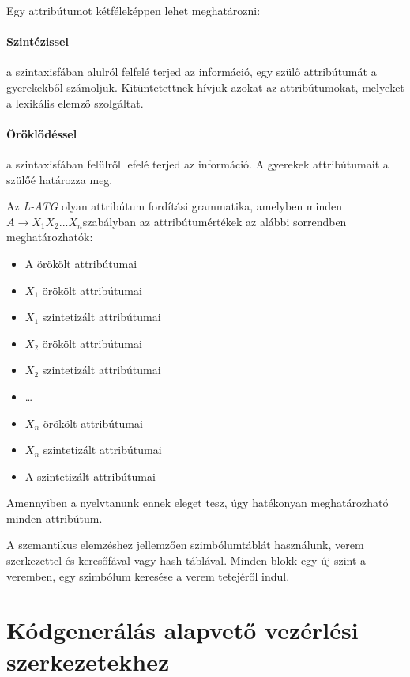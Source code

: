 \documentclass[margin=0px]{article}
\begin{document}
	Egy attribútumot kétféleképpen lehet meghatározni:
	
	\paragraph{Szintézissel} a szintaxisfában alulról felfelé terjed az információ, egy szülő attribútumát a gyerekekből számoljuk. Kitüntetettnek hívjuk azokat az attribútumokat, melyeket a lexikális elemző szolgáltat.
	
	\paragraph{Öröklődéssel} a szintaxisfában felülről lefelé terjed az információ. A gyerekek attribútumait a szülőé határozza meg.
	
	Az \textit{L-ATG} olyan attribútum fordítási grammatika, amelyben minden
	$ A	\rightarrow	X_1X_2 . . .	X_n  $szabályban az attribútumértékek az alábbi sorrendben meghatározhatók:
	
	\begin{itemize}
		\item 
		A örökölt attribútumai
		\item 
		$ X_1 $ örökölt attribútumai
		\item 
		$ X_1 $ szintetizált attribútumai
		\item 
		$ X_2 $ örökölt attribútumai
		\item 
		$ X_2 $ szintetizált attribútumai
		\item 
		\dots
		\item 
		$ X_n $ örökölt attribútumai
		\item 
		$ X_n $ szintetizált attribútumai
		\item 
		A szintetizált attribútumai
	\end{itemize}

	Amennyiben a nyelvtanunk ennek eleget tesz, úgy hatékonyan meghatározható minden attribútum.

	A szemantikus elemzéshez jellemzően szimbólumtáblát használunk, verem szerkezettel és keresőfával vagy hash-táblával. Minden blokk egy új szint a veremben, egy szimbólum keresése a verem tetejéről indul.
	
	
	
	
\section{Kódgenerálás alapvető vezérlési szerkezetekhez}
\end{document}
